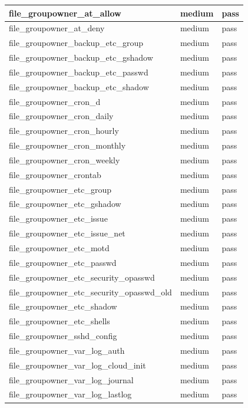 \begin{longtable}{|p{10cm}|p{2cm}|p{2cm}|}
\hline
file\_groupowner\_at\_allow & medium & pass \\
\hline
file\_groupowner\_at\_deny & medium & pass \\
\hline
file\_groupowner\_backup\_etc\_group & medium & pass \\
\hline
file\_groupowner\_backup\_etc\_gshadow & medium & pass \\
\hline
file\_groupowner\_backup\_etc\_passwd & medium & pass \\
\hline
file\_groupowner\_backup\_etc\_shadow & medium & pass \\
\hline
file\_groupowner\_cron\_d & medium & pass \\
\hline
file\_groupowner\_cron\_daily & medium & pass \\
\hline
file\_groupowner\_cron\_hourly & medium & pass \\
\hline
file\_groupowner\_cron\_monthly & medium & pass \\
\hline
file\_groupowner\_cron\_weekly & medium & pass \\
\hline
file\_groupowner\_crontab & medium & pass \\
\hline
file\_groupowner\_etc\_group & medium & pass \\
\hline
file\_groupowner\_etc\_gshadow & medium & pass \\
\hline
file\_groupowner\_etc\_issue & medium & pass \\
\hline
file\_groupowner\_etc\_issue\_net & medium & pass \\
\hline
file\_groupowner\_etc\_motd & medium & pass \\
\hline
file\_groupowner\_etc\_passwd & medium & pass \\
\hline
file\_groupowner\_etc\_security\_opasswd & medium & pass \\
\hline
file\_groupowner\_etc\_security\_opasswd\_old & medium & pass \\
\hline
file\_groupowner\_etc\_shadow & medium & pass \\
\hline
file\_groupowner\_etc\_shells & medium & pass \\
\hline
file\_groupowner\_sshd\_config & medium & pass \\
\hline
file\_groupowner\_var\_log\_auth & medium & pass \\
\hline
file\_groupowner\_var\_log\_cloud\_init & medium & pass \\
\hline
file\_groupowner\_var\_log\_journal & medium & pass \\
\hline
file\_groupowner\_var\_log\_lastlog & medium & pass \\

\end{longtable}
